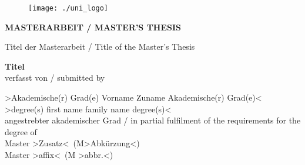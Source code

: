 ﻿\documentclass[12pt]{report}
\begin{document}
\begin{titlepage}

\begin{center}
\begin{figure}
\hspace{9.1cm}
\texttt{[image: ./uni\_logo]}
\end{figure}
\vspace*{2.1cm}

\fontsize{22}{0} \selectfont \textbf{ MASTERARBEIT / MASTER'S THESIS}\\
\vspace*{2.5cm}

\fontsize{11}{0} \selectfont Titel der Masterarbeit / Title of the Master's Thesis\\
\vspace*{0.4cm}

\fontsize{18}{0} \selectfont \textbf{\glqq Titel\grqq}\\

\vspace*{2.8cm}
{\fontsize{11}{0} \selectfont verfasst von / submitted by}\\
\vspace*{0.4cm}

{ \fontsize{14}{0} \selectfont \textgreater Akademische(r) Grad(e) Vorname Zuname Akademische(r) Grad(e)\textless\\
\textgreater degree(s) first name family name degree(s)\textless}\\
\vspace*{1.6cm}
{ \fontsize{11}{0} \selectfont angestrebter akademischer Grad / in partial fulfilment of the requirements for the degree of}\\
\vspace*{0.4cm}
{ \fontsize{14}{0} \selectfont  Master \textgreater Zusatz\textless \ (M\textgreater Abk\"urzung\textless)\\
Master \textgreater affix\textless \ (M \textgreater abbr.\textless)}\\
\vspace*{2.4cm}


\end{center}
\end{titlepage}
\end{document}
